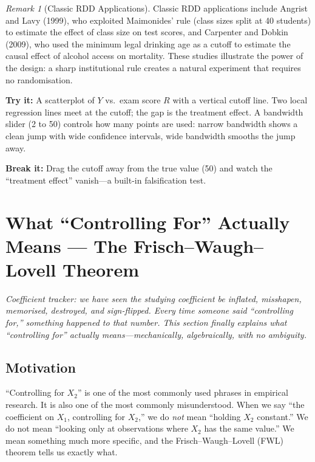 \documentclass[11pt,a4paper]{article}
\theoremstyle{definition}
\theoremstyle{plain}
\theoremstyle{remark}
\newtheorem{remark}{Remark}[section]
\begin{document}
\begin{remark}[Classic RDD Applications]
Classic RDD applications include Angrist and Lavy (1999), who exploited Maimonides' rule (class sizes split at 40 students) to estimate the effect of class size on test scores, and Carpenter and Dobkin (2009), who used the minimum legal drinking age as a cutoff to estimate the causal effect of alcohol access on mortality. These studies illustrate the power of the design: a sharp institutional rule creates a natural experiment that requires no randomisation.
\end{remark}

\begin{vizspec}[title={``The Cliff'' --- Bandwidth Explorer}]
\textbf{Try it:} A scatterplot of $Y$ vs.\ exam score $R$ with a vertical cutoff line. Two local regression lines meet at the cutoff; the gap is the treatment effect. A bandwidth slider (2 to 50) controls how many points are used: narrow bandwidth shows a clean jump with wide confidence intervals, wide bandwidth smooths the jump away.

\textbf{Break it:} Drag the cutoff away from the true value (50) and watch the ``treatment effect'' vanish---a built-in falsification test.
\end{vizspec}

\section{What ``Controlling For'' Actually Means --- The Frisch--Waugh--Lovell Theorem}\label{sec:fwl}

\noindent\textit{Coefficient tracker: we have seen the studying coefficient be inflated, misshapen, memorised, destroyed, and sign-flipped. Every time someone said ``controlling for,'' something happened to that number. This section finally explains what ``controlling for'' actually means---mechanically, algebraically, with no ambiguity.}

\subsection{Motivation}

``Controlling for $X_2$'' is one of the most commonly used phrases in empirical research. It is also one of the most commonly misunderstood. When we say ``the coefficient on $X_1$, controlling for $X_2$,'' we do \emph{not} mean ``holding $X_2$ constant.'' We do not mean ``looking only at observations where $X_2$ has the same value.'' We mean something much more specific, and the Frisch--Waugh--Lovell (FWL) theorem tells us exactly what.
\end{document}
